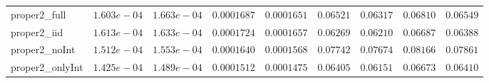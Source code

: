 \begin{table}
\begin{tabular}{lcccccccc}
proper2_full  & $1.603e-04$ & $1.663e-04$ & $0.0001687$ & $0.0001651$ & $0.06521$ & $0.06317$ & $0.06810$ & $0.06549$ \\
proper2_iid  & $1.613e-04$ & $1.633e-04$ & $0.0001724$ & $0.0001657$ & $0.06269$ & $0.06210$ & $0.06687$ & $0.06388$ \\
proper2_noInt  & $1.512e-04$ & $1.553e-04$ & $0.0001640$ & $0.0001568$ & $0.07742$ & $0.07674$ & $0.08166$ & $0.07861$ \\
proper2_onlyInt  & $1.425e-04$ & $1.489e-04$ & $0.0001512$ & $0.0001475$ & $0.06405$ & $0.06151$ & $0.06673$ & $0.06410$ \\
\hline 
\end{tabular}


\end{table}